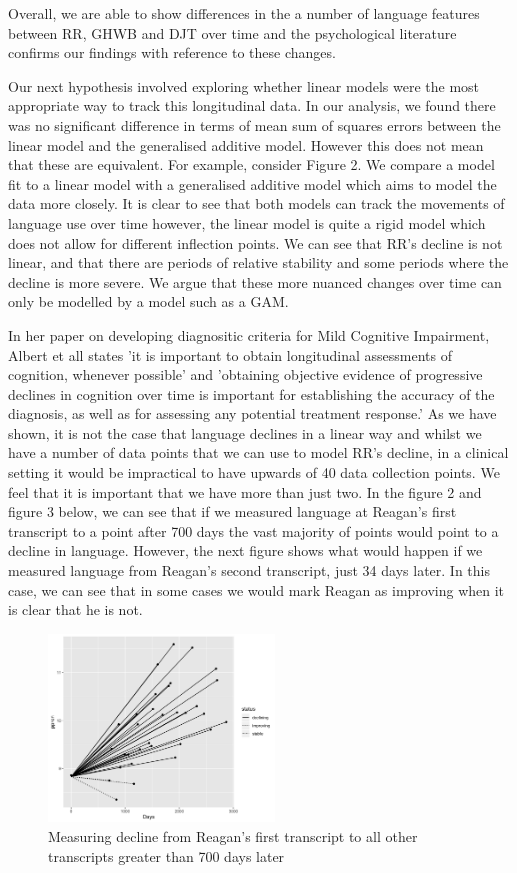 \documentclass[12pt]{article}
\begin{document}
\par 
Overall, we are able to show differences in the a number of language features between RR, GHWB and DJT over time and the psychological literature confirms our findings with reference to these changes.
\par
Our next hypothesis involved exploring whether linear models were the most appropriate way to track this longitudinal data. In our analysis, we found there was no significant difference in terms of mean sum of squares errors between the linear model and the generalised additive model. However this does not mean that these are equivalent. For example, consider Figure 2. We compare a model fit to a linear model with a generalised additive model which aims to model the data more closely. It is clear to see that both models can track the movements of language use over time however, the linear model is quite a rigid model which does not allow for different inflection points. We can see that RR's decline is not linear, and that there are periods of relative stability and some periods where the decline is more severe. We argue that these more nuanced changes over time can only be modelled by a model such as a GAM.
\par
In her paper on developing diagnositic criteria for Mild Cognitive Impairment, Albert et all \cite{Albert2011} states 'it is important to obtain longitudinal assessments of cognition, whenever possible' and 'obtaining objective evidence of progressive declines in cognition over time is important for establishing the accuracy of the diagnosis, as well as for
assessing any potential treatment response.' As we have shown, it is not the case that language declines in a linear way and whilst we have a number of data points that we can use to model RR's decline, in a clinical setting it would be impractical to have upwards of 40 data collection points. We feel that  it is important that we have more than just two. In the figure 2 and figure 3 below, we can see that if we measured language at Reagan's first transcript to a point after 700 days the vast majority of points would point to a decline in language. However, the next figure shows what would happen if we measured language from Reagan's second transcript, just 34 days later. In this case, we can see that in some cases we would mark Reagan as improving when it is clear that he is not.

\begin{figure}[H]
	\centering
	\includegraphics[width=6cm, height=5cm]{plots/comp1.png}
	\caption{Measuring decline from Reagan's first transcript to all other transcripts greater than 700 days later}
\end{figure}
\end{document}
